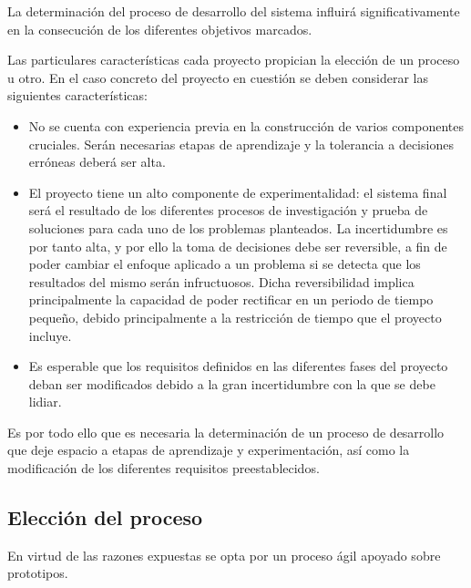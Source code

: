 La determinación del proceso de desarrollo del sistema influirá significativamente en la consecución de los diferentes objetivos marcados.

Las particulares características cada proyecto propician la elección de un proceso u otro. En el caso concreto del proyecto en cuestión se deben considerar las siguientes características:

\begin{itemize}

\item No se cuenta con experiencia previa en la construcción de varios componentes cruciales. Serán necesarias etapas de aprendizaje y la tolerancia a decisiones erróneas deberá ser alta.

\item El proyecto tiene un alto componente de experimentalidad: el sistema final será el resultado de los diferentes procesos de investigación y prueba de soluciones para cada uno de los problemas planteados. La incertidumbre es por tanto alta, y por ello la toma de decisiones debe ser reversible, a fin de poder cambiar el enfoque aplicado a un problema si se detecta que los resultados del mismo serán infructuosos. Dicha reversibilidad implica principalmente la capacidad de poder rectificar en un periodo de tiempo pequeño, debido principalmente a la restricción de tiempo que el proyecto incluye.

\item Es esperable que los requisitos definidos en las diferentes fases del proyecto deban ser modificados debido a la gran incertidumbre con la que se debe lidiar.

\end{itemize}

Es por todo ello que es necesaria la determinación de un proceso de desarrollo que deje espacio a etapas de aprendizaje y experimentación, así como la modificación de los diferentes requisitos preestablecidos. 

\subsection{Elección del proceso}
\label{process}
En virtud de las razones expuestas se opta por un proceso ágil apoyado sobre prototipos. 

